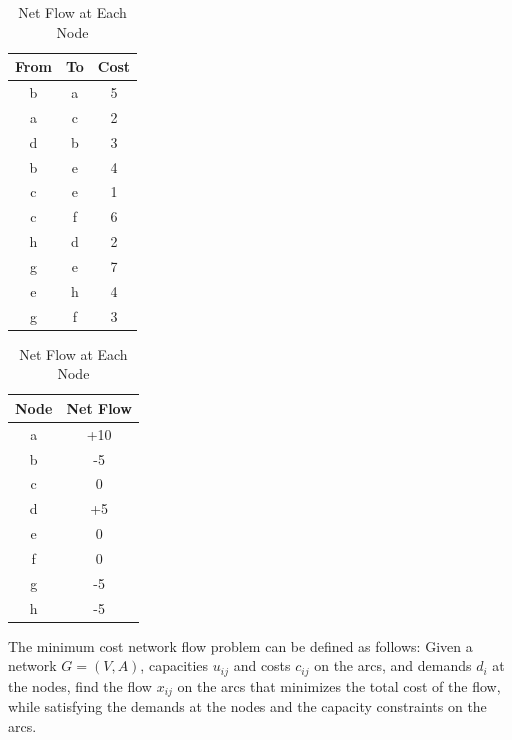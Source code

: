 \begin{table}[h]
    \centering
    \begin{minipage}{0.45\textwidth}
        \centering
        \begin{tabular}{|c|c|c|}
            \hline
            \textbf{From} & \textbf{To} & \textbf{Cost} \\
            \hline
            b & a & {\color{red} 5 }\\
            a & c & {\color{red}2} \\
            d & b & {\color{red}3 }\\
            b & e & {\color{red}4 }\\
            c & e & {\color{red}1 }\\
            c & f & {\color{red}6 }\\
            h & d & {\color{red}2 }\\
            g & e & {\color{red}7 }\\
            e & h & {\color{red}4 }\\
            g & f & {\color{red}3} \\
            \hline
        \end{tabular}
        \caption{Arc Costs in the Network Flow Problem}
        \label{tab:arc_costs}
    \end{minipage}
    \hfill
    \begin{minipage}{0.45\textwidth}
        \centering
        \begin{tabular}{|c|c|}
            \hline
            \textbf{Node} & \textbf{Net Flow} \\
            \hline
            a & {\color{blue}+10} \\
            b & {\color{blue}-5} \\
            c & {\color{blue}0} \\
            d & {\color{blue}+5 }\\
            e & {\color{blue}0} \\
            f & {\color{blue}0} \\
            g & {\color{blue}-5} \\
            h & {\color{blue}-5} \\
            \hline
        \end{tabular}
        \caption{Net Flow at Each Node}
        \label{tab:net_flow}
    \end{minipage}
\end{table}
The minimum cost network flow problem can be defined as follows: Given a network \( G = (V, A) \), capacities \( u_{ij} \) and costs \( c_{ij} \) on the arcs, and demands \( d_i \) at the nodes, find the flow \( x_{ij} \) on the arcs that minimizes the total cost of the flow, while satisfying the demands at the nodes and the capacity constraints on the arcs.

